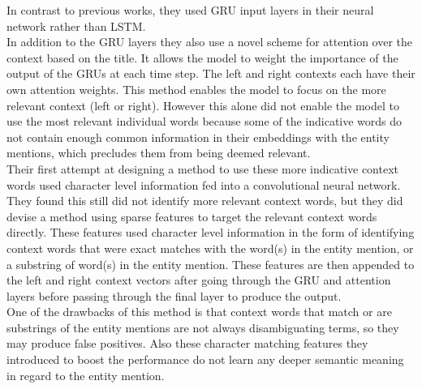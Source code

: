 \documentclass{article}
\begin{document}
In contrast to previous works, they used GRU input layers in their neural network rather than LSTM.  \\
In addition to the GRU layers they also use a novel scheme for attention over the context based on the title.  It allows the model to weight the importance of the output of the GRUs at each time step.  The left and right contexts each have their own attention weights.  This method enables the model to focus on the more relevant context (left or right).  However this alone did not enable the model to use the most relevant individual words because some of the indicative words do not contain enough common information in their embeddings with the entity mentions, which precludes them from being deemed relevant.\\
Their first attempt at designing a method to use these more indicative context words used character level information fed into a convolutional neural network.  They found this still did not identify more relevant context words, but they did devise a method using sparse features to target the relevant context words directly.  These features used character level information in the form of identifying context words that were exact matches with the word(s) in the entity mention, or a substring of word(s) in the entity mention.  These features are then appended to the left and right context vectors after going through the GRU and attention layers before passing through the final layer to produce the output.\\
One of the drawbacks of this method is that context words that match or are substrings of the entity mentions are not always disambiguating terms, so they may produce false positives.  Also these character matching features they introduced to boost the performance do not learn any deeper semantic meaning in regard to the entity mention.\\
\end{document}
